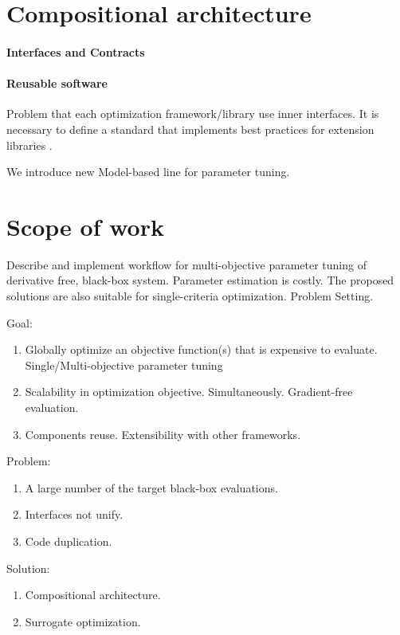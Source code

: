     \section{Compositional architecture}
        \paragraph{Interfaces and Contracts}

        \paragraph{Reusable software}
        Problem that each optimization framework/library use inner interfaces. 
        It is necessary to define a standard that implements best practices for extension libraries \cite{buitinck2013api}.

        We introduce new Model-based line for parameter tuning. 

    \section{Scope of work}

        Describe and implement workflow for multi-objective parameter tuning of derivative free, black-box system. Parameter estimation is costly.
        The proposed solutions are also suitable for single-criteria optimization. Problem Setting.

        Goal:
        \begin{enumerate}
            \item Globally optimize an objective function(s) that is expensive to evaluate. Single/Multi-objective parameter tuning
            \item Scalability in optimization objective. Simultaneously. Gradient-free evaluation.
            \item Components reuse. Extensibility with other frameworks.
        \end{enumerate}

        Problem:
        \begin{enumerate}
            \item A large number of the target black-box evaluations.
            \item Interfaces not unify.
            \item Code duplication.
        \end{enumerate}

        Solution:
        \begin{enumerate}
            \item Compositional architecture.
            \item Surrogate optimization.
        \end{enumerate}

